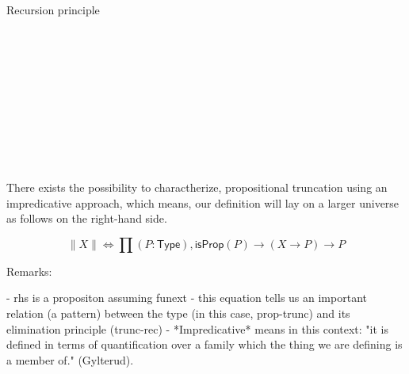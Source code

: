 Recursion principle
\begin{code}%
%
\>[2]\<%
\\
\>[2][@{}l@{\AgdaIndent{0}}]%
\>[4]\AgdaSymbol{:}\AgdaSpace{}%
\AgdaSymbol{\{}\AgdaSpace{}%
\AgdaSymbol{:}\AgdaSpace{}%
\AgdaSpace{}%
\AgdaSymbol{\}}\AgdaSpace{}%
\AgdaSymbol{\{}\AgdaSpace{}%
\AgdaSymbol{:}\AgdaSpace{}%
\AgdaSpace{}%
\AgdaSymbol{\}}\<%
\\
%
\>[4]\AgdaSpace{}%
\AgdaSpace{}%
\<%
\\
%
\>[4]\AgdaSpace{}%
\AgdaSymbol{(}\AgdaSpace{}%
\AgdaSpace{}%
\AgdaSymbol{)}\<%
\\
%
\>[4]\AgdaComment{---------}\<%
\\
%
\>[4]\AgdaSpace{}%
\AgdaSpace{}%
\AgdaSpace{}%
\AgdaSpace{}%
\AgdaSpace{}%
\<%
\\
%
\\[\AgdaEmptyExtraSkip]%
%
\>[2]\AgdaSpace{}%
\AgdaSymbol{\AgdaUnderscore{}}\AgdaSpace{}%
\AgdaSpace{}%
\AgdaSpace{}%
\AgdaSpace{}%
\AgdaSpace{}%
\AgdaSymbol{=}\AgdaSpace{}%
\AgdaSpace{}%
\<%
\\
%
\\[\AgdaEmptyExtraSkip]%
%
\>[2]\AgdaSpace{}%
\AgdaSymbol{=}\AgdaSpace{}%
\<%
\end{code}

There exists the possibility to charactherize, propositional truncation
using an impredicative approach, which means, our definition will lay on
a larger universe as follows on the right-hand side.

$$ ∥ X ∥ ⇔ ∏ (P : \mathsf{Type} ), \mathsf{isProp}(P) → (X → P) → P$$

Remarks:

- rhs is a propositon assuming funext
- this equation tells us an important relation (a pattern) between
the type (in this case, prop-trunc) and its elimination principle (trunc-rec)
- *Impredicative* means in this context: "it is defined in terms of quantification over a family which the thing we are defining is a member of." (Gylterud).


